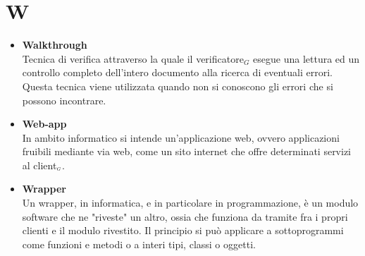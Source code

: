 \chapter{W} \label{W}
	\begin{itemize}
		\item \textbf{Walkthrough}\\
		Tecnica di verifica attraverso la quale il verificatore$_G$	esegue una lettura ed un controllo completo dell’intero documento alla ricerca di eventuali errori.  Questa tecnica viene	utilizzata quando non si conoscono gli errori che si possono incontrare.

		\item \textbf{Web-app}\\
		In ambito informatico si intende un'applicazione web, ovvero applicazioni fruibili mediante via web, come un sito internet che offre determinati servizi al client$_{\scaleto{G}{3pt}}$.

		\item \textbf{Wrapper}\\
		Un wrapper, in informatica, e in particolare in programmazione, è un modulo software che ne "riveste" un altro, ossia che funziona da tramite fra i propri clienti e il modulo rivestito. Il principio si può applicare a sottoprogrammi come funzioni e metodi o a interi tipi, classi o oggetti.

	\end{itemize}
